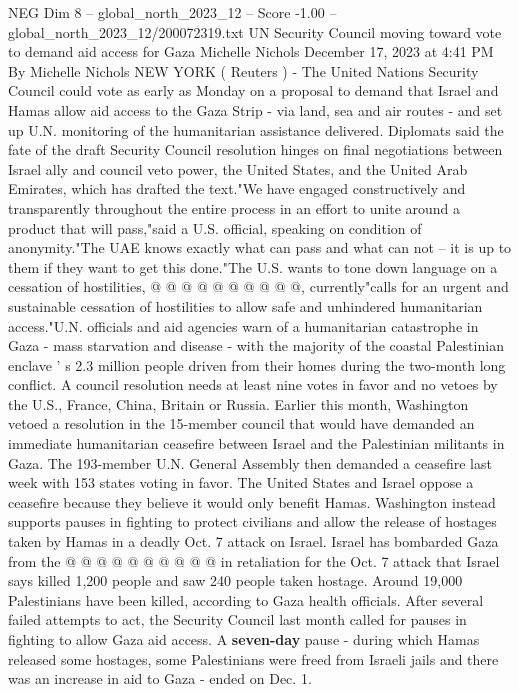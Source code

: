 \begin{textsample}{NEG Dim 8 – global\_north\_2023\_12 – Score -1.00 – global\_north\_2023\_12/200072319.txt}  \label{ex:f8_neg_172}
UN Security Council moving toward vote to demand aid access for Gaza Michelle Nichols December 17, 2023 at 4:41 PM By Michelle Nichols NEW YORK ( Reuters ) - The United Nations Security Council could vote as early as Monday on a proposal to demand that Israel and Hamas allow aid access to the Gaza Strip - via land, sea and air routes - and set up U.N. monitoring of the humanitarian assistance delivered.
Diplomats said the fate of the draft Security Council resolution hinges on final negotiations between Israel ally and council veto power, the United States, and the United Arab Emirates, which has drafted the text."We have engaged constructively and transparently throughout the entire process in an effort to unite around a product that will pass,"said a U.S. official, speaking on condition of anonymity."The UAE knows exactly what can pass and what can not -- it is up to them if they want to get this done."The U.S. wants to tone down language on a cessation of hostilities, @ @ @ @ @ @ @ @ @ @, currently"calls for an urgent and sustainable cessation of hostilities to allow safe and unhindered humanitarian access."U.N. officials and aid agencies warn of a humanitarian catastrophe in Gaza - mass starvation and disease - with the majority of the coastal Palestinian enclave ' s 2.3 million people driven from their homes during the two-month long conflict.
A council resolution needs at least nine votes in favor and no vetoes by the U.S., France, China, Britain or Russia.
Earlier this month, Washington vetoed a resolution in the 15-member council that would have demanded an immediate humanitarian ceasefire between Israel and the Palestinian militants in Gaza.
The 193-member U.N.
General Assembly then demanded a ceasefire last week with 153 states voting in favor.
The United States and Israel oppose a ceasefire because they believe it would only benefit Hamas.
Washington instead supports pauses in fighting to protect civilians and allow the release of hostages taken by Hamas in a deadly Oct. 7 attack on Israel.
Israel has bombarded Gaza from the @ @ @ @ @ @ @ @ @ @ in retaliation for the Oct. 7 attack that Israel says killed 1,200 people and saw 240 people taken hostage.
Around 19,000 Palestinians have been killed, according to Gaza health officials.
After several failed attempts to act, the Security Council last month called for pauses in fighting to allow Gaza aid access.
A \textbf{seven-day} pause - during which Hamas released some hostages, some Palestinians were freed from Israeli jails and there was an increase in aid to Gaza - ended on Dec. 1.

\end{textsample}
